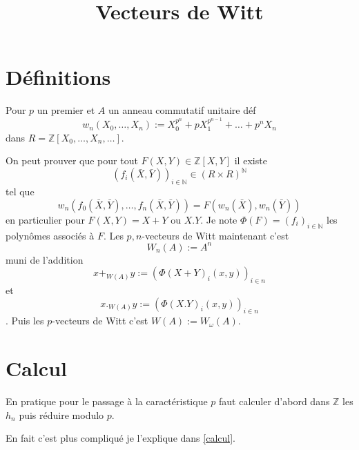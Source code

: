 \documentclass[a4paper,12pt]{article}
\title{Vecteurs de Witt}
\date{}
\newcommand{\Z}{\mathbb{Z}}
\newcommand{\N}{\mathbb{N}}
\theoremstyle{plain}
\theoremstyle{definition}
\theoremstyle{remark}
\begin{document}
\maketitle

\section{Définitions}
Pour $p$ un premier et $A$ un anneau commutatif
unitaire déf 
\[w_n(X_0,\ldots,X_n):=X_0^{p^n}+pX_1^{p^{n-1}}+\ldots+p^nX_n\]
dans $R=\Z[X_0,\ldots,X_n,\ldots]$.

On peut prouver que pour tout
$F(X,Y)\in \Z[X,Y]$ il existe 
\[(f_i(\bar X,\bar Y))_{i\in \N}\in (R\times R)^\N\] tel que
\[w_n(f_0(\bar X,\bar Y),\ldots, f_n(\bar X,\bar Y))=F(w_n(\bar X),w_n(\bar Y))\]
en particulier pour $F(X,Y)=X+Y$ ou $X.Y$. Je note 
$\Phi(F)=(f_i)_{i\in \N}$ les polynômes associés à $F$. 
Les $p,n$-vecteurs de Witt maintenant c'est
\[W_n(A):=A^n\]
muni de l'addition \[x+_{W(A)}y:=(\Phi(X+Y)_i(x,y))_{i\in n}\] et
\[x._{W(A)}y:=(\Phi(X.Y)_i(x,y))_{i\in n}\]. Puis les
$p$-vecteurs de Witt c'est $W(A):=W_{\omega}(A)$.

\section{Calcul}
En pratique pour le passage à la caractéristique $p$ faut calculer
d'abord dans $\Z$ les $h_n$ puis réduire modulo $p$. 

En fait c'est plus compliqué je l'explique dans \ref{calcul}.
\end{document}
